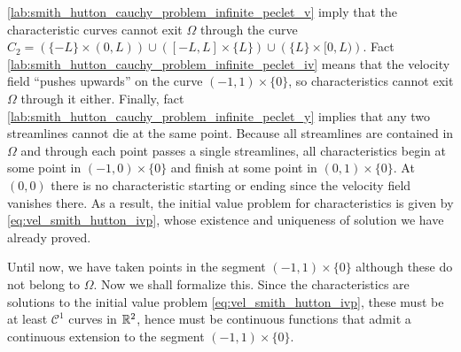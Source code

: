 \ref{lab:smith_hutton_cauchy_problem_infinite_peclet_v} imply that the
characteristic curves cannot exit $\Omega$ through the curve
$C_2 = \left( \{ -L \} \times (0,L) \right) \cup \left( [-L,L] \times \{ L \}
\right) \cup \left( \{ L \} \times [0,L) \right)$. Fact
\ref{lab:smith_hutton_cauchy_problem_infinite_peclet_iv} means that the
velocity field ``pushes upwards'' on the curve $(-1,1) \times \{ 0 \}$, so
characteristics cannot exit $\Omega$ through it either. Finally, fact
\ref{lab:smith_hutton_cauchy_problem_infinite_peclet_y} implies that any two
streamlines cannot die at the same point. Because all streamlines are contained
in $\Omega$ and through each point passes a single streamlines, all
characteristics begin at some point in $(-1,0) \times \{ 0 \}$ and finish at
some point in $(0,1) \times \{ 0 \}$. At $(0,0)$ there is no characteristic
starting or ending since the velocity field vanishes there. As a result, the
initial value problem for characteristics is given by
\eqref{eq:vel_smith_hutton_ivp}, whose existence and uniqueness of solution
we have already proved. 

Until now, we have taken points in the segment $(-1,1) \times \{ 0 \}$ although
these do not belong to $\Omega$. Now we shall formalize this. Since the
characteristics are solutions to the initial value problem
\eqref{eq:vel_smith_hutton_ivp}, these must be at least $\mathcal{C}^1$
curves in $\mathbb{R}^2$, hence must be continuous functions that admit a continuous
extension to the segment $(-1,1) \times \{ 0 \}$.

